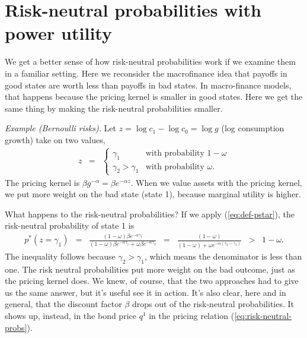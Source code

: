\documentclass[11pt]{article}
\begin{document}
\section{Risk-neutral probabilities with power utility}

We get a better sense of how risk-neutral probabilities work
if we examine them in a familiar setting.
Here we reconsider the macrofinance idea that payoffs in good states are
worth less than payoffs in bad states.
In macro-finance models, that happens because the pricing kernel
is smaller in good states.
Here we get the same thing by making the risk-neutral probabilities smaller.


{\it Example (Bernoulli risks).\/}
Let $ z = \log c_1 - \log c_0 = \log g$ (log consumption growth)
take on two values,
\begin{eqnarray*}
    z &=&   \left\{
            \begin{array}{ll}
            \gamma_1 & \mbox{with probability } 1-\omega \\
            \gamma_2 > \gamma_1 & \mbox{with probability } \omega .
            \end{array}
            \right.
\end{eqnarray*}
The pricing kernel is $\beta g^{-\alpha} = \beta e^{-\alpha z}$.
When we value assets with the pricing kernel, we put more weight
on the bad state (state 1), because marginal utility is higher.

What happens to the risk-neutral probabilities?
If we apply (\ref{eq:def-pstar}),
the risk-neutral probability of state 1 is
\begin{eqnarray*}
        p^*(z=\gamma_1)
            &=& \frac{(1-\omega) \beta e^{-\alpha \gamma_1}}
                    {(1-\omega) \beta e^{-\alpha \gamma_1} + \omega \beta e^{-\alpha \gamma_2}}
            \;\;=\;\; \frac{(1-\omega)}
                    {(1-\omega) + \omega e^{-\alpha (\gamma_2-\gamma_1)}}
            \;\;>\;\; 1-\omega .
\end{eqnarray*}
The inequality follows because $\gamma_2 > \gamma_1$,
which means the denominator is less than one.
The risk neutral probabilities put more weight
on the bad outcome, just as the pricing kernel does.
We knew, of course, that the two approaches had to give us the same answer,
but it's useful see it in action.
It's also clear, here and in general, that the discount factor $\beta$
drops out of the risk-neutral probabilities.
It shows up, instead, in the bond price $q^1$ in the pricing relation
(\ref{eq:risk-neutral-probs}).
\end{document}
